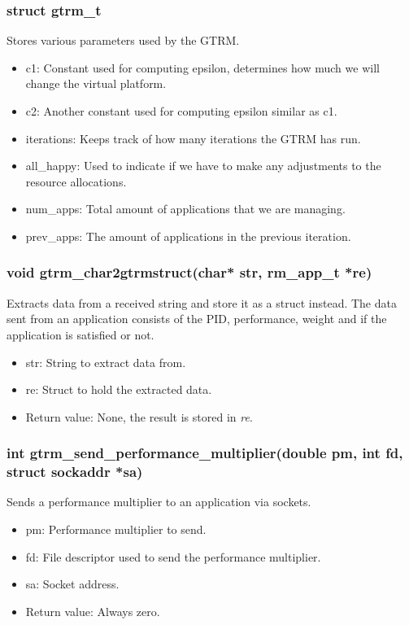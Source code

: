 \documentclass[nobiblatex]{LTHthesis}
\begin{document}
\subsubsection{struct gtrm\_t}
Stores various parameters used by the GTRM.
\begin{itemize}
\item c1: Constant used for computing epsilon, determines how much we will change the virtual platform.
\item c2: Another constant used for computing epsilon similar as c1.
\item iterations: Keeps track of how many iterations the GTRM has run.
\item all\_happy: Used to indicate if we have to make any adjustments to the resource allocations.
\item num\_apps: Total amount of applications that we are managing.
\item prev\_apps: The amount of applications in the previous iteration.
\end{itemize}

\subsubsection{void gtrm\_char2gtrmstruct(char* str, rm\_app\_t *re)}
Extracts data from a received string and store it as a struct instead. The data sent from an application consists of the PID, performance, weight and if the application is satisfied or not.
\begin{itemize} 
\item str: String to extract data from.
\item re: Struct to hold the extracted data.
\item Return value: None, the result is stored in \emph{re}.
\end{itemize}

\subsubsection{int gtrm\_send\_performance\_multiplier(double pm, int fd, struct sockaddr *sa)}
Sends a performance multiplier to an application via sockets.
\begin{itemize} 
\item pm: Performance multiplier to send.
\item fd: File descriptor used to send the performance multiplier.
\item sa: Socket address.
\item Return value: Always zero.
\end{itemize}
\end{document}

